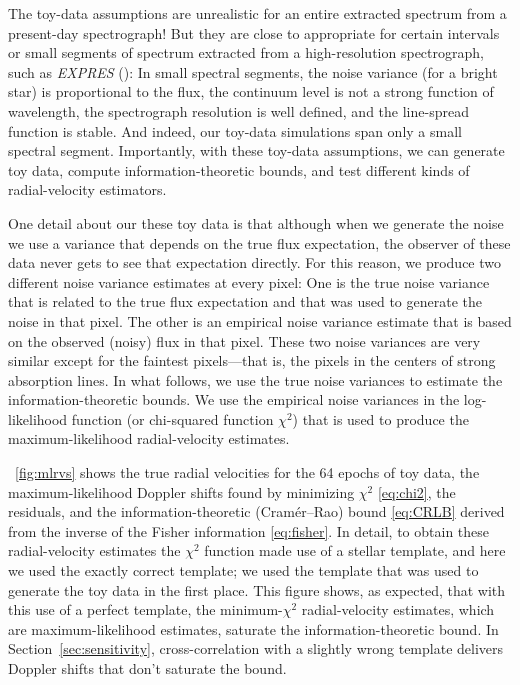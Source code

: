 \documentclass[modern]{aastex631}
\newcommand{\project}[1]{\textsl{#1}}
\newcommand{\sectionname}{Section}
\newcommand{\secref}[1]{\sectionname~\ref{#1}}
\newcommand{\figref}[1]{\figurename~\ref{#1}}
\begin{document}
The toy-data assumptions are unrealistic for an entire extracted spectrum from a present-day spectrograph!
But they are close to appropriate for certain intervals or small segments of spectrum extracted from a high-resolution spectrograph, such as \project{EXPRES} (\citealt{express}):
In small spectral segments, the noise variance (for a bright star) is proportional to the flux, the continuum level is not a strong function of wavelength, the spectrograph resolution is well defined, and the line-spread function is stable.
And indeed, our toy-data simulations span only a small spectral segment.
Importantly, with these toy-data assumptions, we can generate toy data, compute information-theoretic bounds, and test different kinds of radial-velocity estimators.

One detail about our these toy data is that although when we generate the noise we use a variance that depends on the true flux expectation, the observer of these data never gets to see that expectation directly.
For this reason, we produce two different noise variance estimates at every pixel:
One is the true noise variance that is related to the true flux expectation and that was used to generate the noise in that pixel.
The other is an empirical noise variance estimate that is based on the observed (noisy) flux in that pixel.
These two noise variances are very similar except for the faintest pixels---that is, the pixels in the centers of strong absorption lines.
In what follows, we use the true noise variances to estimate the information-theoretic bounds.
We use the empirical noise variances in the log-likelihood function (or chi-squared function $\chi^2$) that is used to produce the maximum-likelihood radial-velocity estimates.

\figref{fig:mlrvs} shows the true radial velocities for the 64 epochs of toy data, the maximum-likelihood Doppler shifts found by minimizing $\chi^2$ \eqref{eq:chi2}, the residuals, and the information-theoretic (Cram\'er--Rao) bound \eqref{eq:CRLB} derived from the inverse of the Fisher information \eqref{eq:fisher}.
In detail, to obtain these radial-velocity estimates the $\chi^2$ function made use of a stellar template, and here we used the exactly correct template; we used the template that was used to generate the toy data in the first place.
This figure shows, as expected, that with this use of a perfect template, the minimum-$\chi^2$ radial-velocity estimates, which are maximum-likelihood estimates, saturate the information-theoretic bound.
In \secref{sec:sensitivity}, cross-correlation with a slightly wrong template delivers Doppler shifts that don't saturate the bound.
\end{document}
